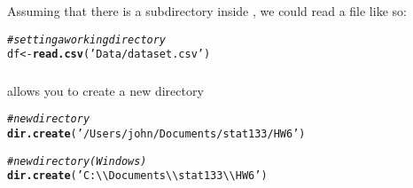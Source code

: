 \documentclass[12pt]{beamer}\usepackage[]{graphicx}\usepackage[]{color}
\makeatletter
\newcommand{\hlstr}[1]{\textcolor[rgb]{0.192,0.494,0.8}{#1}}%
\newcommand{\hlcom}[1]{\textcolor[rgb]{0.678,0.584,0.686}{\textit{#1}}}%
\newcommand{\hlstd}[1]{\textcolor[rgb]{0.345,0.345,0.345}{#1}}%
\newcommand{\hlkwb}[1]{\textcolor[rgb]{0.69,0.353,0.396}{#1}}%
\newcommand{\hlkwd}[1]{\textcolor[rgb]{0.737,0.353,0.396}{\textbf{#1}}}%
\newenvironment{kframe}{%
 \def\at@end@of@kframe{}%
 \ifinner\ifhmode%
  \def\at@end@of@kframe{\end{minipage}}%
  \begin{minipage}{\columnwidth}%
 \fi\fi%
 \def\FrameCommand##1{\hskip\@totalleftmargin \hskip-\fboxsep
 \colorbox{shadecolor}{##1}\hskip-\fboxsep
     \hskip-\linewidth \hskip-\@totalleftmargin \hskip\columnwidth}%
 \MakeFramed {\advance\hsize-\width
   \@totalleftmargin\z@ \linewidth\hsize
   \@setminipage}}%
 {\par\unskip\endMakeFramed%
 \at@end@of@kframe}
\newenvironment{knitrout}{}{} %
\makeatother
\begin{document}

\begin{frame}[fragile]
\frametitle{}

Assuming that there is a subdirectory  inside , we could read a file like so:
\begin{knitrout}\footnotesize
{}\color{fgcolor}\begin{kframe}
\begin{alltt}
\hlcom{# setting a working directory}
\hlstd{df} \hlkwb{<-} \hlkwd{read.csv}\hlstd{(}\hlstr{'Data/dataset.csv'}\hlstd{)}
\end{alltt}
\end{kframe}
\end{knitrout}

\end{frame}


\begin{frame}[fragile]
\frametitle{}

{\hilit {}} allows you to create a new directory
\begin{knitrout}\footnotesize
{}\color{fgcolor}\begin{kframe}
\begin{alltt}
\hlcom{# new directory}
\hlkwd{dir.create}\hlstd{(}\hlstr{'/Users/john/Documents/stat133/HW6'}\hlstd{)}

\hlcom{# new directory (Windows)}
\hlkwd{dir.create}\hlstd{(}\hlstr{'C:\textbackslash{}\textbackslash{}Documents\textbackslash{}\textbackslash{}stat133\textbackslash{}\textbackslash{}HW6'}\hlstd{)}
\end{alltt}
\end{kframe}
\end{knitrout}

\end{frame}

\end{document}

